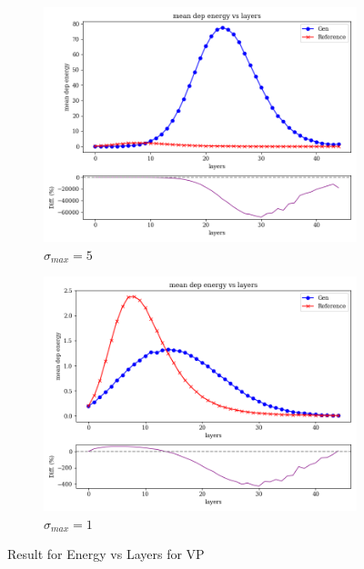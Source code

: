 \begin{figure}[bthp]
\begin{subfigure}[b]{0.23\textwidth}
        \centering
        \includegraphics[width=\textwidth]{Figures/vp5_3.png}
        \caption{$\sigma_{max}=5$}
        \label{fig:vp5_3}
    \end{subfigure}
    \hfill
    \begin{subfigure}[b]{0.23\textwidth}  %
        \centering
        \includegraphics[width=\textwidth]{Figures/vp1_3.png}
        \caption{$\sigma_{max}=1$}
        \label{fig:vp1_3}
    \end{subfigure}
    \caption{Result for Energy vs Layers for VP}
\end{figure}


